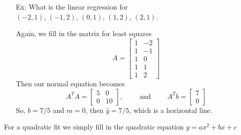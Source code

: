\documentclass[reqno]{amsart}
\theoremstyle{definition}
\begin{document}
\begin{itemize}
\item[Ex:  ]  What is the linear regression for $(-2,1),\, (-1,2),\, (0,1),\, (1,2),\, (2,1)$.


Again, we fill in the matrix for least squares
%
\begin{equation*}
A = \begin{bmatrix}
1 & -2\\
1 & -1\\
1 & 0\\
1 & 1\\
1 & 2
\end{bmatrix}
\end{equation*}
%
Then our normal equation becomes
%
\begin{equation*}
A^TA = \begin{bmatrix}
5 & 0\\
0 & 10
\end{bmatrix},\qquad \text{  and  } \qquad A^Tb = \begin{bmatrix}
7\\
0
\end{bmatrix}
\end{equation*}
%
So, $b = 7/5$ and $m = 0$, then $\hat{y} = 7/5$, which is a horizontal line.

\end{itemize}

For a quadratic fit we simply fill in the quadratic equation $y = ax^2 + bx + c$
\end{document}
